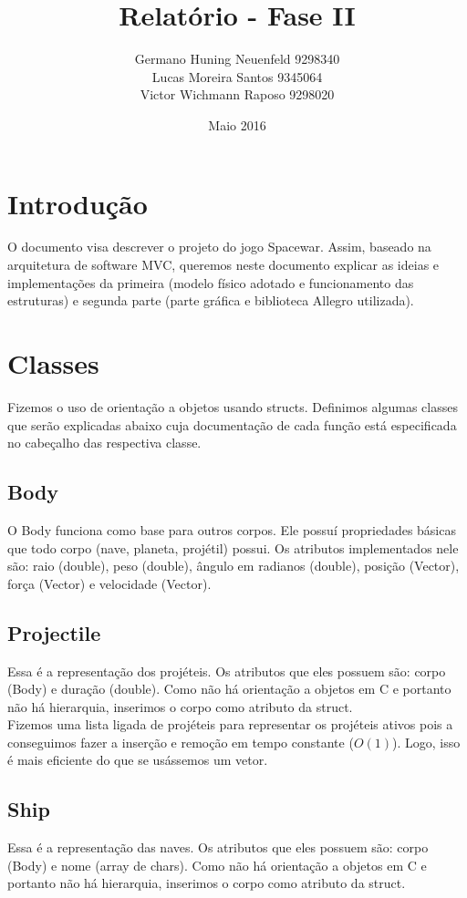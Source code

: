 \documentclass{article}
\title{Relatório - Fase II}
\author{
    Germano Huning Neuenfeld 9298340
    \\
    Lucas Moreira Santos 9345064
    \\
    Victor Wichmann Raposo 9298020
}
\date{Maio 2016}
\begin{document}
\maketitle
\section{Introdução}
O documento visa descrever o projeto do jogo Spacewar. Assim, baseado na arquitetura de software MVC, queremos neste documento explicar as ideias e implementações
da primeira (modelo físico adotado e funcionamento das estruturas) e segunda parte (parte gráfica e biblioteca Allegro utilizada).

\section{Classes}
Fizemos o uso de orientação a objetos usando structs. Definimos algumas classes que serão explicadas abaixo
cuja documentação de cada função está especificada no cabeçalho das respectiva classe.

\subsection{Body}
O Body funciona como base para outros corpos. Ele possuí propriedades básicas que todo corpo (nave, planeta, projétil) possui.
Os atributos implementados nele são: raio (double), peso (double), ângulo em radianos (double), posição (Vector), força (Vector) e velocidade (Vector).

\subsection{Projectile}
Essa é a representação dos projéteis. Os atributos que eles possuem são: corpo (Body) e duração (double).
Como não há orientação a objetos em C e portanto não há hierarquia, inserimos o corpo como atributo da struct.\\
Fizemos uma lista ligada de projéteis para representar os projéteis ativos pois a conseguimos fazer a inserção e remoção em tempo constante ($O(1)$).
Logo, isso é mais eficiente do que se usássemos um vetor.

\subsection{Ship}
Essa é a representação das naves. Os atributos que eles possuem são: corpo (Body) e nome (array de chars).
Como não há orientação a objetos em C e portanto não há hierarquia, inserimos o corpo como atributo da struct.
\end{document}
